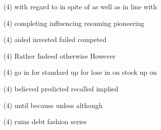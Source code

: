 \item
\begin{tasks}(4)
	\task with regard to
	\task in spite of
	\task as well as
	\task in line with
\end{tasks}
\item
\begin{tasks}(4)
	\task completing
	\task influencing
	\task resuming
	\task pioneering
\end{tasks}
\item
\begin{tasks}(4)
	\task aided
	\task invested
	\task failed
	\task competed
\end{tasks}
\item
\begin{tasks}(4)
	\task Rather
	\task Indeed
	\task otherwise
	\task However
\end{tasks}
\item
\begin{tasks}(4)
	\task go in for
	\task standard up for
	\task lose in on
	\task stock up on
\end{tasks}
\item
\begin{tasks}(4)
	\task believed
	\task predicted
	\task recalled
	\task implied
\end{tasks}
\item
\begin{tasks}(4)
	\task until
	\task because
	\task unless
	\task although
\end{tasks}
\item
\begin{tasks}(4)
	\task ruins
	\task debt
	\task fashion
	\task series
\end{tasks}